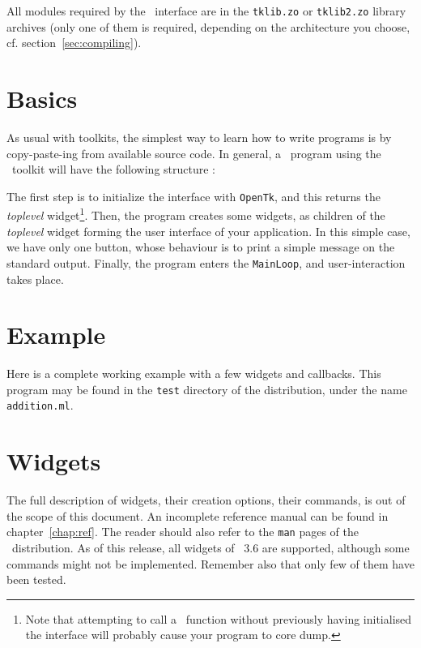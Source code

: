 All modules required by the \camltk\ interface are in the \verb|tklib.zo|
or \verb|tklib2.zo| library archives (only one of them is required,
depending on the architecture you choose, cf. section~\ref{sec:compiling}).

\section{Basics}
As usual with toolkits, the simplest way to learn how to write programs is
by copy-paste-ing from available source code. In general, a \caml\ program
using the \tk\ toolkit will have the following structure :

\begin{alltt}

\end{alltt}

The first step is to initialize the interface with \verb|OpenTk|, and this
returns the {\em toplevel} widget\footnote{Note that attempting to call a
\camltk\ function without previously having initialised the interface will
probably cause your program to core dump.}.
Then, the program creates some widgets, as children of the {\em toplevel}
widget forming the user interface of your application. In this simple case,
we have only one button, whose behaviour is to print a simple message on the
standard output. Finally, the program enters the \verb|MainLoop|, and
user-interaction takes place.

\section{Example}
Here is a complete working example with a few widgets and callbacks.
This program may be found in the \verb|test| directory of the distribution,
under the name \verb|addition.ml|.

\begin{alltt}

\end{alltt}

\section{Widgets}
The full description of widgets, their creation options, their commands, is
out of the scope of this document. An incomplete reference manual can be
found in chapter~\ref{chap:ref}.
The reader should also refer to the \verb|man| pages of the \tk\
distribution. 
As of this release, all widgets of \tk\ 3.6 are supported, although some
commands might not be implemented. Remember also that only few of them have
been tested.

